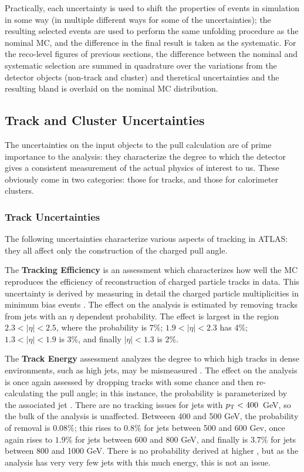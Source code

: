  Practically, each uncertainty is used to shift the properties of events in simulation in some way (in multiple different ways for some of the uncertainties); the resulting selected events are used to perform the same unfolding procedure as the nominal MC, and the difference in the final result is taken as the systematic. For the reco-level figures of previous sections, the difference between the nominal and systematic selection are summed in quadrature over the variations from the detector objects (non-track and cluster) and theretical uncertainties and the resulting bland is overlaid on the nominal MC distribution.

	\subsection{Track and Cluster Uncertainties}
	\label{chapter:color:uncertainties:inputs}

	The uncertainties on the input objects to the pull calculation are of prime importance to the analysis: they characterize the degree to which the detector gives a consistent measurement of the actual physics of interest to us. These obviously come in two categories: those for tracks, and those for calorimeter clusters. 

	\subsubsection{Track Uncertainties}

	The following uncertainties characterize various aspects of tracking in ATLAS: they all affect only the construction of the charged pull angle.

	The \textbf{Tracking Efficiency} is an assessment which characterizes how well the MC reproduces the efficiency of reconstruction of charged particle tracks in data. This uncertainty is derived by measuring in detail the charged particle multiplicities in minimum bias events . The effect on the analysis is estimated by removing tracks from jets with an $\eta$ dependent probability. The effect is largest in the region $2.3 < |\eta| < 2.5$, where the probability is $7\%$; $1.9 < |\eta| < 2.3$ has 4\%; $1.3 < |\eta| < 1.9$ is 3\%, and finally $|\eta| < 1.3$ is 2\%. 


	The \textbf{Track Energy} assessment analyzes the degree to which high \pt tracks in dense environments, such as high \pt jets, may be mismeasured . The effect on the analysis is once again assessed by dropping tracks with some chance and then re-calculating the pull angle; in this instance, the probability is parameterized by the associated jet \pt. There are no tracking issues for jets with $p_{\text{T}} < 400$~GeV, so the bulk of the analysis is unaffected. Betweeen 400 and 500 GeV, the probability of removal is $0.08\%$; this rises to $0.8\%$ for jets between 500 and 600 Gev, once again rises to $1.9\%$ for jets between 600 and 800 GeV, and finally is $3.7\%$ for jets between 800 and 1000 GeV. There is no probability derived at higher \pt, but as the analysis has very very few jets with this much energy, this is not an issue.

